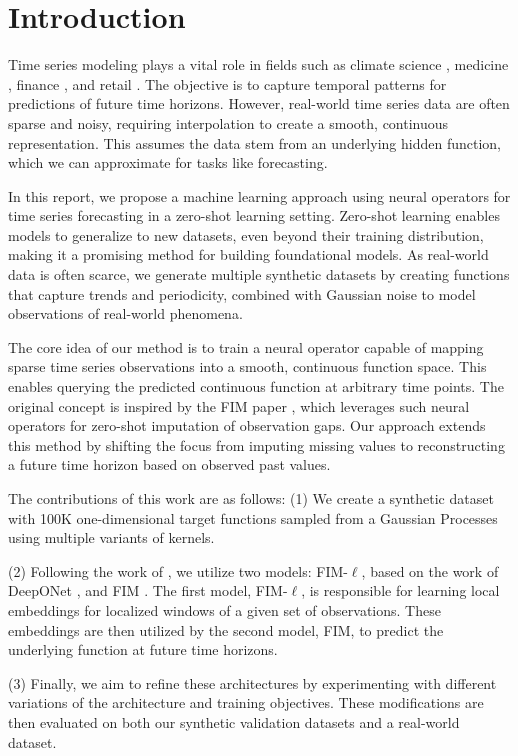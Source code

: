 \documentclass{article}
\theoremstyle{plain}
\theoremstyle{definition}
\theoremstyle{remark}
\begin{document}
\section{Introduction}

Time series modeling plays a vital role in fields such as climate science \cite{climate}, medicine \cite{medicine}, finance \cite{finance}, and retail \cite{retail}. The objective is to capture temporal patterns for predictions of future time horizons. However, real-world time series data are often sparse and noisy, requiring interpolation to create a smooth, continuous representation. This assumes the data stem from an underlying hidden function, which we can approximate for tasks like forecasting.

In this report, we propose a machine learning approach using neural operators for time series forecasting in a zero-shot learning setting.
Zero-shot learning enables models to generalize to new datasets, even beyond their training distribution, making it a promising method for building foundational models. 
As real-world data is often scarce, we generate multiple synthetic datasets by creating functions that capture trends and periodicity, combined with Gaussian noise to model observations of real-world phenomena.

The core idea of our method is to train a neural operator capable of mapping sparse time series observations into a smooth, continuous function space. This enables querying the predicted continuous function at arbitrary time points. The original concept is inspired by the FIM paper \cite{fim-l}, which leverages such neural operators for zero-shot imputation of observation gaps. Our approach extends this method by shifting the focus from imputing missing values to reconstructing a future time horizon based on observed past values.

The contributions of this work are as follows: (1) We create a synthetic dataset with 100K one-dimensional target functions sampled from a Gaussian Processes using multiple variants of kernels.

(2) Following the work of \cite{fim-l}, we utilize two models: FIM-$\ell$, based on the work of DeepONet \cite{Deeponet}, and FIM \cite{fim-l}. The first model, FIM-$\ell$, is responsible for learning local embeddings for localized windows of a given set of observations. These embeddings are then utilized by the second model, FIM, to predict the underlying function at future time horizons.

 (3) Finally, we aim to refine these architectures by experimenting with different variations of the architecture and training objectives. These modifications are then evaluated on both our synthetic validation datasets and a real-world dataset.
\end{document}
